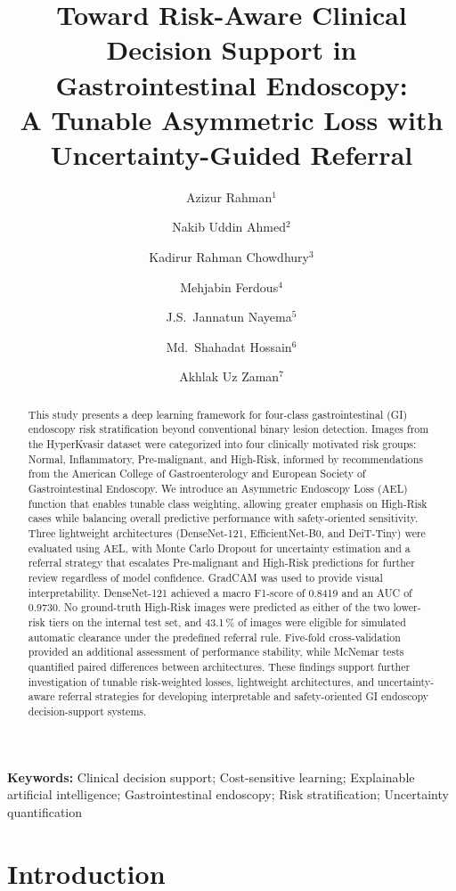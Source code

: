 \documentclass[11pt,a4paper]{article}
\title{\textbf{Toward Risk-Aware Clinical Decision Support in Gastrointestinal Endoscopy:\\
A Tunable Asymmetric Loss with Uncertainty-Guided Referral}}
\author{%
  Azizur Rahman$^{1}$\orcidlink{0009-0007-6945-6953} \and
  Nakib Uddin Ahmed$^{2}$\orcidlink{0009-0006-6515-5750} \and
  Kadirur Rahman Chowdhury$^{3}$ \and
  Mehjabin Ferdous$^{4}$ \and
  J.S.\ Jannatun Nayema$^{5}$ \and
  Md.\ Shahadat Hossain$^{6}$ \and
  Akhlak Uz Zaman$^{7}$\orcidlink{0000-0001-6327-6942}
}
\date{}
\begin{document}
\maketitle
\vspace{2pt}

\begin{singlespace}
\begin{abstract}
This study presents a deep learning framework for four-class gastrointestinal
(GI) endoscopy risk stratification beyond conventional binary lesion
detection. Images from the HyperKvasir dataset were categorized into four
clinically motivated risk groups: Normal, Inflammatory, Pre-malignant, and
High-Risk, informed by recommendations from the American College of
Gastroenterology and European Society of Gastrointestinal Endoscopy. We
introduce an Asymmetric Endoscopy Loss (AEL) function that enables tunable
class weighting, allowing greater emphasis on High-Risk cases while
balancing overall predictive performance with safety-oriented sensitivity.
Three lightweight architectures (DenseNet-121, EfficientNet-B0, and
DeiT-Tiny) were evaluated using AEL, with Monte Carlo Dropout for
uncertainty estimation and a referral strategy that escalates Pre-malignant
and High-Risk predictions for further review regardless of model confidence.
GradCAM was used to provide visual interpretability. DenseNet-121 achieved a
macro F1-score of 0.8419 and an AUC of 0.9730. No ground-truth High-Risk
images were predicted as either of the two lower-risk tiers on the internal
test set, and 43.1\,\% of images were eligible for simulated automatic
clearance under the predefined referral rule.
Five-fold cross-validation provided an additional assessment of performance
stability, while McNemar tests quantified paired differences between
architectures. These findings support further investigation of
tunable risk-weighted losses, lightweight architectures, and
uncertainty-aware referral strategies for developing interpretable and
safety-oriented GI endoscopy decision-support systems.
\end{abstract}

\noindent\textbf{Keywords:}
Clinical decision support;
Cost-sensitive learning;
Explainable artificial intelligence;
Gastrointestinal endoscopy;
Risk stratification;
Uncertainty quantification
\end{singlespace}

\linenumbers

\section{Introduction}
\label{sec:intro}
\end{document}
